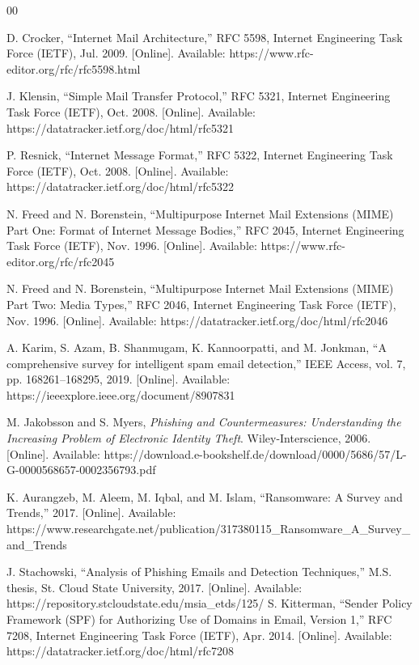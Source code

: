 \documentclass[conference]{IEEEtran}
\begin{document}
\begin{thebibliography}{00}

D. Crocker, ``Internet Mail Architecture,'' RFC 5598, Internet Engineering Task Force (IETF), Jul. 2009. [Online]. Available: https://www.rfc-editor.org/rfc/rfc5598.html

J. Klensin, ``Simple Mail Transfer Protocol,'' RFC 5321, Internet Engineering Task Force (IETF), Oct. 2008. [Online]. Available: https://datatracker.ietf.org/doc/html/rfc5321

P. Resnick, ``Internet Message Format,'' RFC 5322, Internet Engineering Task Force (IETF), Oct. 2008. [Online]. Available: https://datatracker.ietf.org/doc/html/rfc5322

N. Freed and N. Borenstein, ``Multipurpose Internet Mail Extensions (MIME) Part One: Format of Internet Message Bodies,'' RFC 2045, Internet Engineering Task Force (IETF), Nov. 1996. [Online]. Available: https://www.rfc-editor.org/rfc/rfc2045

N. Freed and N. Borenstein, ``Multipurpose Internet Mail Extensions (MIME) Part Two: Media Types,'' RFC 2046, Internet Engineering Task Force (IETF), Nov. 1996. [Online]. Available: https://datatracker.ietf.org/doc/html/rfc2046

A. Karim, S. Azam, B. Shanmugam, K. Kannoorpatti, and M. Jonkman, ``A comprehensive survey for intelligent spam email detection,'' IEEE Access, vol. 7, pp. 168261–168295, 2019. [Online]. Available: https://ieeexplore.ieee.org/document/8907831

M. Jakobsson and S. Myers, \textit{Phishing and Countermeasures: Understanding the Increasing Problem of Electronic Identity Theft}. Wiley-Interscience, 2006. [Online]. Available: https://download.e-bookshelf.de/download/0000/5686/57/L-G-0000568657-0002356793.pdf

K. Aurangzeb, M. Aleem, M. Iqbal, and M. Islam, ``Ransomware: A Survey and Trends,'' 2017. [Online]. Available: https://www.researchgate.net/publication/317380115\_Ransomware\_A\_Survey\_and\_Trends

J. Stachowski, ``Analysis of Phishing Emails and Detection Techniques,'' M.S. thesis, St. Cloud State University, 2017. [Online]. Available: https://repository.stcloudstate.edu/msia\_etds/125/
S. Kitterman, ``Sender Policy Framework (SPF) for Authorizing Use of Domains in Email, Version 1,'' RFC 7208, Internet Engineering Task Force (IETF), Apr. 2014. [Online]. Available: https://datatracker.ietf.org/doc/html/rfc7208


\end{thebibliography}
\end{document}

